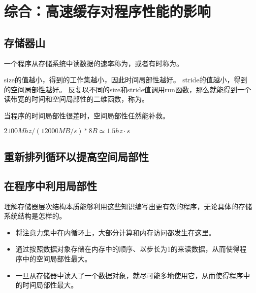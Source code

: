 
\section{综合：高速缓存对程序性能的影响}
{
    \subsection{存储器山}
    {
        一个程序从存储系统中读数据的速率称为，或者有时称为。

        size的值越小，得到的工作集越小，因此时间局部性越好。
        stride的值越小，得到的空间局部性越好。
        反复以不同的size和stride值调用run函数，那么就能得到一个读带宽的时间和空间局部性的二维函数，称为。

        当程序的时间局部性很差时，空间局部性任然能补救。

        \begin{practicec}
            $2100Mhz / (12000 MB / s) * 8B \simeq 1.5 hz \cdot s$
        \end{practicec}
    }

    \subsection{重新排列循环以提高空间局部性}
    {

    }

    \subsection{在程序中利用局部性}
    {
        理解存储器层次结构本质能够利用这些知识编写出更有效的程序，无论具体的存储系统结构是怎样的。

        \begin{itemize}
            \item 将注意力集中在内循环上，大部分计算和内存访问都发生在这里。
            \item 通过按照数据对象存储在内存中的顺序、以步长为1的来读数据，从而使得程序中的空间局部性最大。
            \item 一旦从存储器中读入了一个数据对象，就尽可能多地使用它，从而使得程序中的时间局部性最大。
        \end{itemize}
    }
}
